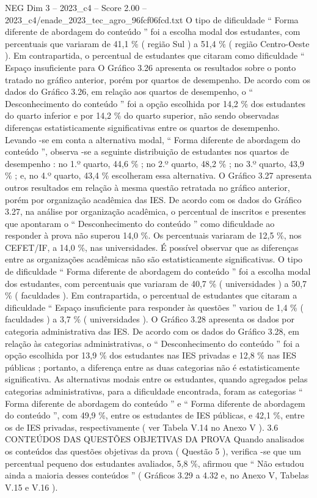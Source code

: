 \begin{textsample}{NEG Dim 3 – 2023\_c4 – Score 2.00 – 2023\_c4/enade\_2023\_tec\_agro\_96fcf06fcd.txt}
O tipo de dificuldade “ Forma diferente de abordagem do conteúdo ” foi a escolha modal dos estudantes, com percentuais que variaram de 41,1 \% ( região Sul ) a 51,4 \% ( região Centro-Oeste ).
Em contrapartida, o percentual de estudantes que citaram como dificuldade “ Espaço insuficiente para O Gráfico 3.26 apresenta os resultados sobre o ponto tratado no gráfico anterior, porém por quartos de desempenho.
De acordo com os dados do Gráfico 3.26, em relação aos quartos de desempenho, o “ Desconhecimento do conteúdo ” foi a opção escolhida por 14,2 \% dos estudantes do quarto inferior e por 14,2 \% do quarto superior, não sendo observadas diferenças estatisticamente significativas entre os quartos de desempenho.
Levando -se em conta a alternativa modal, “ Forma diferente de abordagem do conteúdo ”, observa -se a seguinte distribuição de estudantes nos quartos de desempenho : no 1.º quarto, 44,6 \% ; no 2.º quarto, 48,2 \% ; no 3.º quarto, 43,9 \% ; e, no 4.º quarto, 43,4 \% escolheram essa alternativa.
O Gráfico 3.27 apresenta outros resultados em relação à mesma questão retratada no gráfico anterior, porém por organização acadêmica das IES.
De acordo com os dados do Gráfico 3.27, na análise por organização acadêmica, o percentual de inscritos e presentes que apontaram o “ Desconhecimento do conteúdo ” como dificuldade ao responder à prova não superou 14,0 \%.
Os percentuais variaram de 12,5 \%, nos CEFET/IF, a 14,0 \%, nas universidades.
É possível observar que as diferenças entre as organizações acadêmicas não são estatisticamente significativas.
O tipo de dificuldade “ Forma diferente de abordagem do conteúdo ” foi a escolha modal dos estudantes, com percentuais que variaram de 40,7 \% ( universidades ) a 50,7 \% ( faculdades ).
Em contrapartida, o percentual de estudantes que citaram a dificuldade “ Espaço insuficiente para responder às questões ” variou de 1,4 \% ( faculdades ) a 3,7 \% ( universidades ).
O Gráfico 3.28 apresenta os dados por categoria administrativa das IES.
De acordo com os dados do Gráfico 3.28, em relação às categorias administrativas, o “ Desconhecimento do conteúdo ” foi a opção escolhida por 13,9 \% dos estudantes nas IES privadas e 12,8 \% nas IES públicas ; portanto, a diferença entre as duas categorias não é estatisticamente significativa.
As alternativas modais entre os estudantes, quando agregados pelas categorias administrativas, para a dificuldade encontrada, foram as categorias “ Forma diferente de abordagem do conteúdo ” e “ Forma diferente de abordagem do conteúdo ”, com 49,9 \%, entre os estudantes de IES públicas, e 42,1 \%, entre os de IES privadas, respectivamente ( ver Tabela V.14 no Anexo V ). 3.6 CONTEÚDOS DAS QUESTÕES OBJETIVAS DA PROVA Quando analisados os conteúdos das questões objetivas da prova ( Questão 5 ), verifica -se que um percentual pequeno dos estudantes avaliados, 5,8 \%, afirmou que “ Não estudou ainda a maioria desses conteúdos ” ( Gráficos 3.29 a 4.32 e, no Anexo V, Tabelas V.15 e V.16 ).

\end{textsample}
